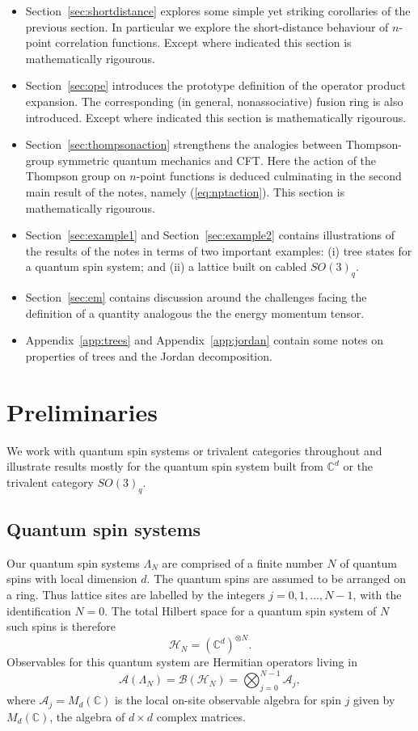 \documentclass[11pt,oneside]{amsart}
\theoremstyle{plain}%
\theoremstyle{definition}
\theoremstyle{remark}
\begin{document}
\begin{itemize}
	\item Section~\ref{sec:shortdistance} explores some simple yet striking corollaries of the previous section. In particular we explore the short-distance behaviour of $n$-point correlation functions. Except where indicated this section is mathematically rigourous.
	\item Section~\ref{sec:ope} introduces the prototype definition of the operator product expansion. The corresponding (in general, nonassociative) fusion ring is also introduced. Except where indicated this section is mathematically rigourous.
	\item Section~\ref{sec:thompsonaction} strengthens the analogies between Thompson-group symmetric quantum mechanics and CFT. Here the action of the Thompson group on $n$-point functions is deduced culminating in the second main result of the notes, namely (\ref{eq:nptaction}). This section is mathematically rigourous.
	\item Section~\ref{sec:example1} and Section~\ref{sec:example2} contains illustrations of the results of the notes in terms of two important examples: (i) tree states for a quantum spin system; and (ii) a lattice built on cabled $\mathit{SO}(3)_q$.
	\item Section~\ref{sec:em} contains discussion around the challenges facing the definition of a quantity analogous the the energy momentum tensor. 
	\item Appendix~\ref{app:trees} and Appendix~\ref{app:jordan} contain some notes on properties of trees and the Jordan decomposition.
\end{itemize}

\section{Preliminaries}\label{sec:preliminaries}
We work with quantum spin systems or trivalent categories throughout and illustrate results mostly for the quantum spin system built from $\mathbb{C}^d$ or the trivalent category $\mathit{SO}(3)_q$.

\subsection{Quantum spin systems}
Our quantum spin systems $\Lambda_N$ are comprised of a finite number $N$ of quantum spins with local dimension $d$. The quantum spins are assumed to be arranged on a ring. Thus lattice sites are labelled by the integers $j = 0, 1, \ldots, N-1$, with the identification $N= 0$. The total Hilbert space for a quantum spin system of $N$ such spins is therefore
\begin{equation}
	\mathcal{H}_N = (\mathbb{C}^d)^{\otimes N}.
\end{equation}
Observables for this quantum system are Hermitian operators living in
\begin{equation}
	\mathcal{A}(\Lambda_N)= \mathcal{B}(\mathcal{H}_N) = \bigotimes_{j=0}^{N-1} \mathcal{A}_j,
\end{equation}
where $\mathcal{A}_j= M_d(\mathbb{C})$ is the local on-site observable algebra for spin $j$ given by $M_d(\mathbb{C})$, the algebra of $d\times d$ complex matrices.
\end{document}
